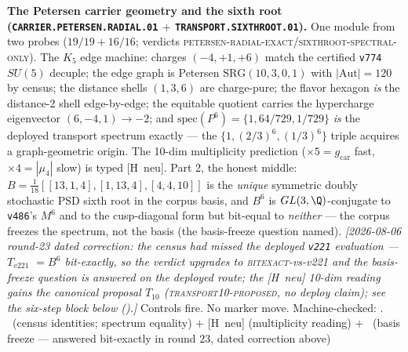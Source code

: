 \documentclass[11pt,a4paper]{article}
\newcommand{\gcar}{g_{\mathrm{car}}}
\theoremstyle{definition}
\begin{document}
\par\smallskip\noindent\textbf{The Petersen carrier geometry and
the sixth root (\texttt{CARRIER.PETERSEN.RADIAL.01} $+$
\texttt{TRANSPORT.SIXTHROOT.01}).}
One module from two probes ($19/19+16/16$; verdicts
\textsc{petersen-radial-exact}/\textsc{sixthroot-spectral-only}).
The $K_5$ edge machine: charges $(-4,+1,+6)$ match the certified
\texttt{v774} $SU(5)$ decuple; the edge graph is Petersen
$\mathrm{SRG}(10,3,0,1)$ with $|\mathrm{Aut}|=120$ by census; the distance
shells $(1,3,6)$ are charge-pure; the flavor hexagon \emph{is} the
distance-2 shell edge-by-edge; the equitable quotient carries the
hypercharge eigenvector $(6,-4,1)\to-2$; and
$\mathrm{spec}(P^6)=\{1,64/729,1/729\}$ \emph{is} the deployed
transport spectrum exactly --- the $\{1,(2/3)^6,(1/3)^6\}$ triple
acquires a graph-geometric origin.  The 10-dim multiplicity
prediction ($\times5=\gcar$ fast, $\times4=|\mu_4|$ slow) is typed
[H~neu].  Part 2, the honest middle:
$B=\tfrac1{18}[[13,1,4],[1,13,4],[4,4,10]]$ is the \emph{unique}
symmetric doubly stochastic PSD sixth root in the corpus basis, and
$B^6$ is $GL(3,\Q)$-conjugate to \texttt{v486}'s $M^6$ and to the
cusp-diagonal form but bit-equal to \emph{neither} --- the corpus
freezes the spectrum, not the basis (the basis-freeze question
named).  \emph{[2026-08-06 round-23 dated correction: the census
had missed the deployed \texttt{v221} evaluation --- $T_{v221}$
$=B^6$ \emph{bit-exactly}, so the verdict upgrades to
\textsc{bitexact}-vs-v221 and the basis-freeze question is
answered on the deployed route; the [H~neu] 10-dim reading gains
the canonical proposal $T_{10}$ (\textsc{transport10-proposed},
no deploy claim); see the six-step block below
().]}
Controls fire.  No marker move.
Machine-checked: .
\mE\ (census identities; spectrum equality) $+$ [H~neu]
(multiplicity reading) $+$ \mO\ (basis freeze --- answered
bit-exactly in round 23, dated correction above)
\par\smallskip
\end{document}
